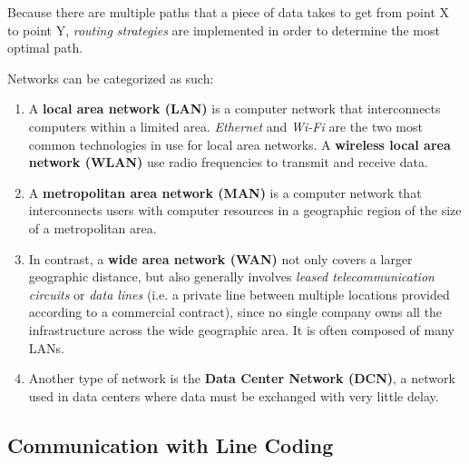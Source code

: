 \documentclass{article}
\begin{document}
  Because there are multiple paths that a piece of data takes to get from point X to point Y, \textit{routing strategies} are implemented in order to determine the most optimal path.  

  \begin{definition}
  Networks can be categorized as such: 
  \begin{enumerate}
      \item A \textbf{local area network (LAN)} is a computer network that interconnects computers within a limited area. \textit{Ethernet} and \textit{Wi-Fi} are the two most common technologies in use for local area networks. A \textbf{wireless local area network (WLAN)} use radio frequencies to transmit and receive data. 
      \item A \textbf{metropolitan area network (MAN)} is a computer network that interconnects users with computer resources in a geographic region of the size of a metropolitan area. 
      \item In contrast, a \textbf{wide area network (WAN)} not only covers a larger geographic distance, but also generally involves \textit{leased telecommunication circuits} or \textit{data lines} (i.e. a private line between multiple locations provided according to a commercial contract), since no single company owns all the infrastructure across the wide geographic area. It is often composed of many LANs. 
      \item Another type  of network is the \textbf{Data Center Network (DCN)}, a network used in data centers where data must be exchanged with very little delay.
  \end{enumerate}
  \end{definition}

  \subsection{Communication with Line Coding}
\end{document}
